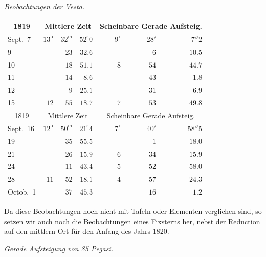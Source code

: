 \emph{Beobachtungen der Vesta.}

\begin{center}
\begin{tabular}{l|rrr|rrr}
\multicolumn{1}{c|}{1819}  &  \multicolumn{3}{c|}{Mittlere Zeit}  &  \multicolumn{3}{c}{Scheinbare Gerade Aufsteig.}  \\
\hline
Sept.\ 7  &  $13^{\mathrm u}$  &  $32^{\mathrm m}$  &  $52^{\mathrm s}0$  &  $9^\circ$  &  $28'$  &  $7''2$  \\
9  &   &  $23$  &  $32.6$  &   &  $6$  &  $10.5$  \\
10  &   &  $18$  &  $51.1$  &  $8$  &  $54$  &  $44.7$  \\
11  &   &  $14$  &  $8.6$  &   &  $43$  &  $1.8$  \\
12  &   &  $9$  &  $25.1$  &   &  $31$  &  $6.9$  \\
15  &  $12$  &  $55$  &  $18.7$  &  $7$  &  $53$  &  $49.8$  \\
\hline
 \multicolumn{1}{c|}{1819}  &  \multicolumn{3}{c|}{Mittlere Zeit}  &  \multicolumn{3}{c}{Scheinbare Gerade Aufsteig.}  \\
\hline
 Sept.\ 16  &  $12^{\mathrm u}$  &  $50^{\mathrm m}$  &  $21^{\mathrm s}4$  &  $7^\circ$  &  $40'$  &  $58''5$  \\
 19  &   &  $35$  &  $55.5$  &   &  $1$  &  $18.0$  \\
 21  &   &  $26$  &  $15.9$  &  $6$  &  $34$  &  $15.9$  \\
 24  &   &  $11$  &  $43.4$  &  $5$  &  $52$  &  $58.0$  \\
 28  &  $11$  &  $52$  &  $18.1$  &  $4$  &  $57$  &  $24.3$  \\
 Octob.\ 1  &   &  $37$  &  $45.3$  &   &  $16$  &  $1.2$  \\
\end{tabular}
\end{center}

\par\indent Da diese Beobachtungen noch nicht mit Tafeln oder Elementen verglichen sind, so setzen wir auch noch die Beobachtungen eines Fixsterns her, nebst der Reduction auf den mittlern Ort für den Anfang des Jahrs 1820.


\begin{center}
\emph{Gerade Aufsteigung von 85 Pegasi.}
\end{center}

